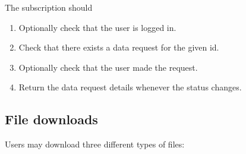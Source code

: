 \functionality

The subscription should

\begin{enumerate}
    \item Optionally check that the user is logged in.
    \item Check that there exists a data request for the given id.
    \item Optionally check that the user made the request.
    \item Return the data request details whenever the status changes.
\end{enumerate}

\subsection{File downloads}

Users may download three different types of files:

